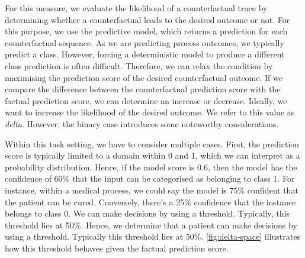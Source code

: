 \documentclass[./../../paper.tex]{subfiles}
\begin{document}
For this measure, we evaluate the likelihood of a counterfactual trace by determining whether a counterfactual leads to the desired outcome or not. For this purpose, we use the predictive model, which returns a prediction for each counterfactual sequence. As we are predicting process outcomes, we typically predict a class. However, forcing a deterministic model to produce a different class prediction is often difficult. Therefore, we can relax the condition by maximising the prediction score of the desired counterfactual outcome\cite{molnar2019}. If we compare the difference between the counterfactual prediction score with the factual prediction score, we can determine an increase or decrease. Ideally, we want to increase the likelihood of the desired outcome. We refer to this value as \emph{delta}. However, the binary case introduces some noteworthy considerations. 

Within this task setting, we have to consider multiple cases. First, the prediction score is typically limited to a domain within 0 and 1, which we can interpret as a probability distribution. Hence, if the model score is 0.6, then the model has the confidence of 60\% that the input can be categorised as belonging to class 1. For instance, within a medical process, we could say the model is 75\% confident that the patient can be cured. Conversely, there's a 25\%  confidence that the \gls{instance} belongs to class 0. We can make decisions by using a threshold. Typically, this threshold lies at 50\%. Hence, we determine that a patient can make decisions by using a threshold. Typically this threshold lies at 50\%. \autoref{fig:delta-space} illustrates how this threshold behaves given the factual prediction score. 
\end{document}
